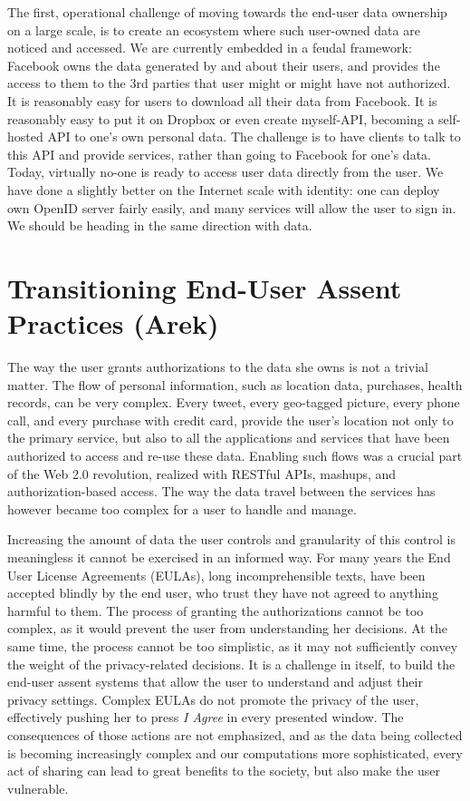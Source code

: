 The first, operational challenge of moving towards the end-user data ownership on a large scale, is to create an ecosystem where such user-owned data are noticed and accessed.
We are currently embedded in a feudal framework: Facebook owns the data generated by and about their users, and provides the access to them to the 3rd parties that user might or might have not authorized.
It is reasonably easy for users to download all their data from Facebook.
It is reasonably easy to put it on Dropbox or even create myself-API, becoming a self-hosted API to one's own personal data.
The challenge is to have clients to talk to this API and provide services, rather than going to Facebook for one's data.
Today, virtually no-one is ready to access user data directly from the user.
We have done a slightly better on the Internet scale with identity: one can deploy own OpenID server fairly easily, and many services will allow the user to sign in.
We should be heading in the same direction with data.

\section{Transitioning End-User Assent Practices (Arek)}

The way the user grants authorizations to the data she owns is not a trivial matter.
The flow of personal information, such as location data, purchases, health records, can be very complex.
Every tweet, every geo-tagged picture, every phone call, and every purchase with credit card, provide the user's location not only to the primary service, but also to all the applications and services that have been authorized to access and re-use these data.
Enabling such flows was a crucial part of the Web 2.0 revolution, realized with RESTful APIs, mashups, and authorization-based access.
The way the data travel between the services has however became too complex for a user to handle and manage.

Increasing the amount of data the user controls and granularity of this control is meaningless it cannot be exercised in an informed way.
For many years the End User License Agreements (EULAs), long incomprehensible texts, have been accepted blindly by the end user, who trust they have not agreed to anything harmful to them.
The process of granting the authorizations cannot be too complex, as it would prevent the user from understanding her decisions.
At the same time, the process cannot be too simplistic, as it may not sufficiently convey the weight of the privacy-related decisions.
It is a challenge in itself, to build the end-user assent systems that allow the user to understand and adjust their privacy settings.
Complex EULAs do not promote the privacy of the user, effectively pushing her to press \emph{I Agree} in every presented window.
The consequences of those actions are not emphasized, and as the data being collected is becoming increasingly complex and our computations more sophisticated, every act of sharing can lead to great benefits to the society, but also make the user vulnerable.

